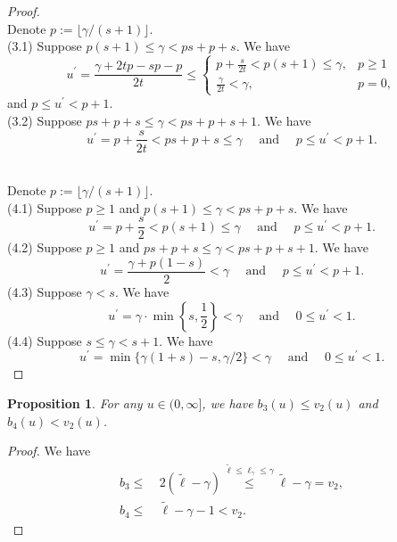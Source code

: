\documentclass{article}
\theoremstyle{plain}
\newtheorem{proposition}[theorem]{Proposition}
\theoremstyle{definition}
\theoremstyle{remark}
\begin{document}
\begin{appendix}
\begin{proof}
\\
\noindent Denote $p:=\lfloor \gamma/(s+1)\rfloor$.\\
(3.1) Suppose $p(s+1) \leq \gamma < ps+p+s$. We have
   $$
   u^{\prime} = \frac{\gamma +2t p - sp-p}{2t} 
   \leq 
   \left\{\begin{matrix}
p+\frac{s}{2t} < p(s+1) \leq \gamma, & p \geq 1  \\
\frac{\gamma}{2t} < \gamma, & p=0,
\end{matrix}\right.
   $$ 
   and $p \leq u^{\prime} < p+1$.\\
   (3.2) Suppose $ps+p+s \leq \gamma < ps+p+s+1$. We have
   $$
   u^{\prime} = p + \frac{s}{2t} < ps+p+s \leq \gamma \quad \text{ and } \quad p \leq u^{\prime} < p+1.
   $$ 



\\
\noindent Denote $p:=\lfloor \gamma/(s+1)\rfloor$.\\
   (4.1) Suppose $p \geq 1$ and $p(s+1) \leq \gamma < ps+p+s$. We have
   $$
   u^{\prime} = p + \frac{s}{2} < p(s+1) \leq \gamma \quad \text{ and } \quad p \leq u^{\prime} < p+1.
   $$  
   (4.2) Suppose $p \geq 1$ and $ps+p+s \leq \gamma < ps+p+s+1$. We have
   $$
   u^{\prime} = \frac{\gamma + p(1-s)}{2} < \gamma \quad \text{ and } \quad p \leq u^{\prime} < p+1.
   $$  
   (4.3) Suppose $\gamma < s$. We have
   $$
   u^{\prime} = \gamma \cdot \min\left\{s, \frac{1}{2}\right\} < \gamma \quad \text{ and } \quad 0 \leq u^{\prime} < 1.
   $$  
   (4.4) Suppose $s \leq \gamma < s+1$. We have
   $$
   u^{\prime} = \min\{\gamma (1+s)-s, \gamma / 2 \} < \gamma \quad \text{ and } \quad 0 \leq u^{\prime} < 1.
   $$ 
\end{proof}















\begin{proposition}\label{prop_e_2}
For any $u \in (0, \infty]$, we have $b_3(u) \leq v_2(u)$ and $b_4(u) < v_2(u)$. %
\end{proposition}
\begin{proof}
    We have
    \begin{align*}
        b_3 \leq &~ 2(\tilde{\ell} - \gamma) \overset{\tilde{\ell} \leq \ell_{\gamma} \leq \gamma}{\leq} \tilde{\ell} - \gamma = v_2,\\
        b_4 \leq &~ \tilde{\ell} - \gamma - 1 < v_2.
    \end{align*}

\end{proof}






\end{appendix}
\end{document}
